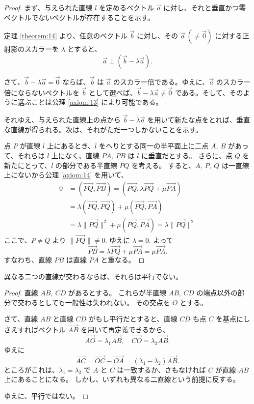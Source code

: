 \begin{proof}
  まず、与えられた直線 \(l\) を定めるベクトル \(\vec{a}\) に対し、それと垂直かつ零ベクトルでないベクトルが存在することを示す。
  
  定理 \ref{theorem:14} より、任意のベクトル \(\vec{b}\) に対し、その \(\vec{a}\ (\neq\vec{0})\) に対する正射影のスカラーを \(\lambda\) とすると、
  \[\vec{a}\perp(\vec{b}-\lambda\vec{a}).\]

  さて、\(\vec{b}-\lambda\vec{a}=\vec{0}\) ならば、\(\vec{b}\) は \(\vec{a}\) のスカラー倍である。ゆえに、\(\vec{a}\) のスカラー倍にならないベクトルを \(\vec{b}\) として選べば、\(\vec{b}-\lambda\vec{a}\neq\vec{0}\) である。そして、そのように選ぶことは公理 \ref{axiom:13} により可能である。

  それゆえ、与えられた直線上の点から \(\vec{b}-\lambda\vec{a}\) を用いて新たな点をとれば、垂直な直線が得られる。次は、それがただ一つしかないことを示す。

  点 \(P\) が直線 \(l\) 上にあるとき、\(l\) をへりとする同一の半平面上に二点 \(A,\ B\) があって、それらは \(l\) 上になく、直線 \(PA,\ PB\) は \(l\) に垂直だとする。
  さらに、点 \(Q\) を新たにとって、\(l\) の部分である半直線 \(PQ\) を考える。
  すると、\(A,\ P,\ Q\) は一直線上にないから公理 \ref{axiom:14} を用いて、
  \begin{align*}
    0 &= (\overrightarrow{PQ},\overrightarrow{PB})=(\overrightarrow{PQ},\lambda\overrightarrow{PQ}+\mu\overrightarrow{PA}) \\
      &= \lambda(\overrightarrow{PQ},\overrightarrow{PQ})+\mu(\overrightarrow{PQ},\overrightarrow{PA}) \\
      &= \lambda\|\overrightarrow{PQ}\|^2+\mu(\overrightarrow{PQ},\overrightarrow{PA})=\lambda\|\overrightarrow{PQ}\|^2
  \end{align*}
  ここで、\(P\neq Q\) より \(\|\overrightarrow{PQ}\|\neq0.\)
  ゆえに \(\lambda=0.\)
  よって
  \[\overrightarrow{PB}=\lambda\overrightarrow{PQ}+\mu\overrightarrow{PA}=\mu\overrightarrow{PA}.\]
  すなわち、直線 \(PB\) は直線 \(PA\) と重なる。
\end{proof}

\begin{thm}\label{theorem:28}
  異なる二つの直線が交わるならば、それらは平行でない。
\end{thm}

\begin{proof}
  直線 \(AB,\ CD\) があるとする。
  これらが半直線 \(AB,\ CD\) の端点以外の部分で交わるとしても一般性は失われない。
  その交点を \(O\) とする。

  さて、直線 \(AB\) と直線 \(CD\) がもし平行だとすると、直線 \(CD\) も点 \(C\) を基点にしさえすればベクトル \(\overrightarrow{AB}\) を用いて再定義できるから、
  \[\overrightarrow{AO}=\lambda_1\overrightarrow{AB},\quad \overrightarrow{CO}=\lambda_2\overrightarrow{AB}.\]
  ゆえに
  \[\overrightarrow{AC}=\overrightarrow{OC}-\overrightarrow{OA}=(\lambda_1-\lambda_2)\overrightarrow{AB}.\]
  ところがこれは、\(\lambda_1=\lambda_2\) で \(A\) と \(C\) は一致するか、さもなければ \(C\) が直線 \(AB\) 上にあることになる。
  しかし、いずれも異なる二直線という前提に反する。

  ゆえに、平行ではない。
\end{proof}

